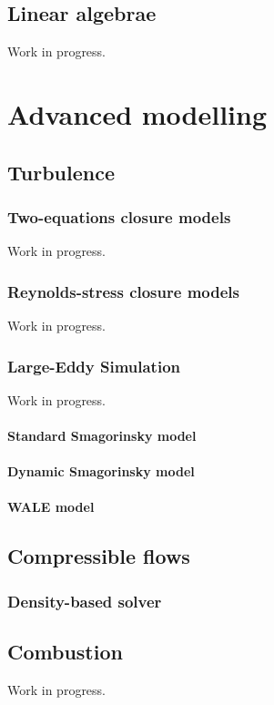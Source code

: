 \documentclass[a4paper,10pt,twoside]{csdoc}
\newcounter{prog}[part]
\begin{document}
\chapter{Linear algebrae}
Work in progress.


\part{Advanced modelling}
\setcounter{chapter}{0}
\setcounter{section}{0}
\setcounter{equation}{0}
\setcounter{figure}{0}

\chapter{Turbulence}
\section{Two-equations closure models}
Work in progress.
\section{Reynolds-stress closure models}
Work in progress.
\section{Large-Eddy Simulation}
Work in progress.
\subsection{Standard Smagorinsky model}
\subsection{Dynamic Smagorinsky model}
\subsection{WALE model}

\chapter{Compressible flows}
\section{Density-based solver}

\chapter{Combustion}
Work in progress.
\end{document}
